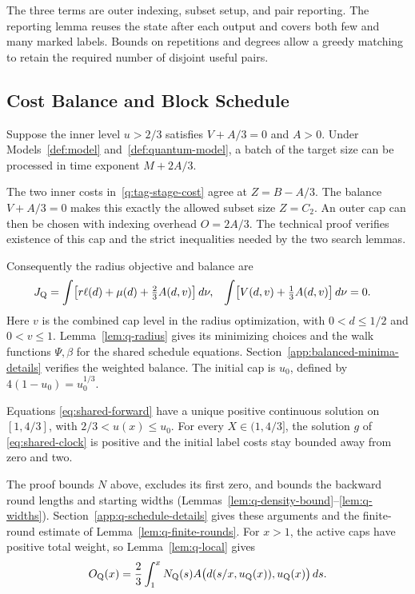 \documentclass[runningheads,envcountsame,envcountsect,orivec]{llncs}
\begin{document}
The three terms are outer indexing, subset setup, and pair reporting.
The reporting lemma reuses the state after each output and covers both
few and many marked labels. Bounds on repetitions and degrees allow a
greedy matching to retain the required number of disjoint useful pairs.

\subsection{Cost Balance and Block Schedule}
\label{sec:q-balance}
\label{q:continuation}


\begin{lemma}
\label{lem:q-local}
Suppose the inner level $u>2/3$ satisfies $V+A/3=0$ and
$A>0$. Under Models~\ref{def:model} and~\ref{def:quantum-model},
a batch of the target size can be processed in time exponent
$M+2A/3$.
\end{lemma}


The two inner costs in~\eqref{q:tag-stage-cost} agree at
$Z=B-A/3$. The balance $V+A/3=0$ makes this exactly the allowed
subset size $Z=C_2$. An outer cap can then be chosen with
indexing overhead $O=2A/3$. The technical proof verifies existence
of this cap and the strict inequalities needed by the two search lemmas.

Consequently the radius objective and balance are
\begin{align}
 J_{\rm Q}
   &=\int\bigl[r\ell(d)+\mu(d)+\tfrac23A(d,v)\bigr]\,d\nu,
 &\int\bigl[V(d,v)+\tfrac13A(d,v)\bigr]\,d\nu&=0.
 \label{eq:separation-q}
\end{align}
Here $v$ is the combined cap level in the radius optimization,
with $0<d\le1/2$ and $0<v\le1$.
Lemma~\ref{lem:q-radius} gives its minimizing choices and the walk
functions $\Psi,\beta$ for the shared schedule equations.
Section~\ref{app:balanced-minima-details} verifies the weighted balance.
The initial cap is $u_0$, defined by $4(1-u_0)=u_0^{1/3}$.


\begin{lemma}
\label{q:positive-flow}
Equations \eqref{eq:shared-forward} have a unique positive continuous
solution on $[1,4/3]$, with $2/3<u(x)\le u_0$. For every
$X\in(1,4/3]$, the solution $g$ of \eqref{eq:shared-clock} is positive
and the initial label costs stay bounded away from zero and two.
\end{lemma}


The proof bounds $N$ above, excludes its first zero, and bounds the
backward round lengths and starting widths
(Lemmas~\ref{lem:q-density-bound}--\ref{lem:q-widths}).
Section~\ref{app:q-schedule-details} gives these arguments and the
finite-round estimate of Lemma~\ref{lem:q-finite-rounds}.
For $x>1$, the active caps have positive total weight, so
Lemma~\ref{lem:q-local} gives
\begin{align}
 O_{\rm Q}(x)
  =\frac23\int_1^x N_{\rm Q}(s)
    A\bigl(d(s/x,u_{\rm Q}(x)),u_{\rm Q}(x)\bigr)\,ds .
 \label{eq:q-overhead}
\end{align}
\end{document}
